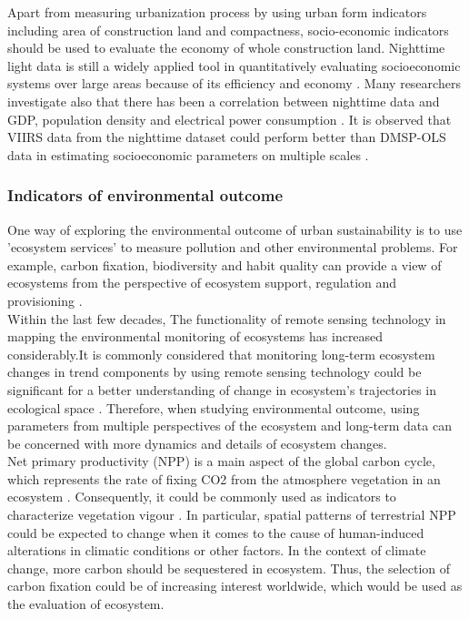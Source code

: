 Apart from measuring urbanization process by using urban form indicators including area of construction land and compactness, socio-economic indicators should be used to evaluate the economy of whole construction land. Nighttime light data is still a widely applied tool in quantitatively evaluating socioeconomic systems over large areas because of its efficiency and economy \parencite{zhao_tweets_2018}. Many researchers investigate also that there has been a correlation between nighttime data and GDP, population density and electrical power consumption \parencite{zhou_nighttime_2015}. It is observed that VIIRS data from the nighttime dataset could perform better than DMSP-OLS data in estimating socioeconomic parameters on multiple scales \parencite{zhou_nighttime_2015}.\\


\subsubsection{Indicators of environmental outcome}
One way of exploring the environmental outcome of urban sustainability is to use 'ecosystem services' to measure pollution and other environmental problems. For example, carbon fixation, biodiversity and habit quality can provide a view of ecosystems from the perspective of ecosystem support, regulation and provisioning \parencite{phillips_evaluating_2008}. \\

Within the last few decades, The functionality of remote sensing technology in mapping the environmental monitoring of ecosystems has increased considerably.It is commonly considered that monitoring long-term ecosystem changes in trend components by using remote sensing technology could be significant for a better understanding of change in ecosystem's trajectories in ecological space \parencite{zewdie_monitoring_2017}. Therefore, when studying environmental outcome, using parameters from multiple perspectives of the ecosystem and long-term data can be concerned with more dynamics and details of ecosystem changes.\\

Net primary productivity (NPP) is a main aspect of the global carbon cycle, which represents the rate of fixing CO2 from the atmosphere vegetation in an ecosystem \parencite{jiang_modelling_1999}. Consequently, it could be commonly used as indicators to characterize vegetation vigour \parencite{hazarika_estimation_2005}. In particular, spatial patterns of terrestrial NPP could be expected to change when it comes to the cause of human-induced alterations in climatic conditions or other factors. In the context of climate change, more carbon should be sequestered in ecosystem. Thus, the selection of carbon fixation could be of increasing interest worldwide, which would be used as the evaluation of ecosystem.\\


